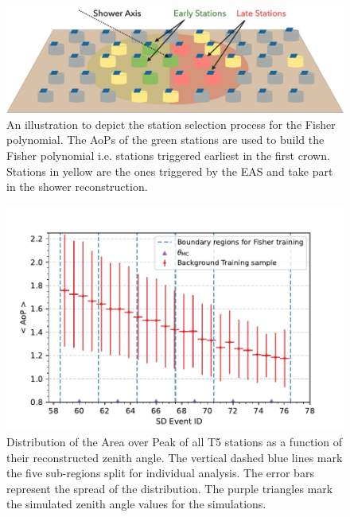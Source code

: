 \begin{figure}[h!]
  \centering
  \includegraphics[width=\textwidth]{thesis_figures/Nu_analysis/Fisher_early_late.pdf}
  \caption{An illustration to depict the station selection process for the Fisher polynomial. The AoPs of the green stations are used to build the Fisher polynomial i.e. stations triggered earliest in the first crown. Stations in yellow are the ones triggered by the EAS and take part in the shower reconstruction.}
  \label{fig:AoP_early_late}
\end{figure}

\begin{figure}[h!]
  \centering
  \includegraphics[width=\textwidth]{thesis_figures/Nu_analysis/Selection_AoP_theta_wnt_redcut.pdf}
  \caption{Distribution of the Area over Peak of all T5 stations as a function of their reconstructed zenith angle. The vertical dashed blue lines mark the five sub-regions split for individual analysis. The error bars represent the spread of the distribution. The purple triangles mark the simulated zenith angle values for the simulations.}
  \label{fig:AoP_v_theta}
\end{figure}

